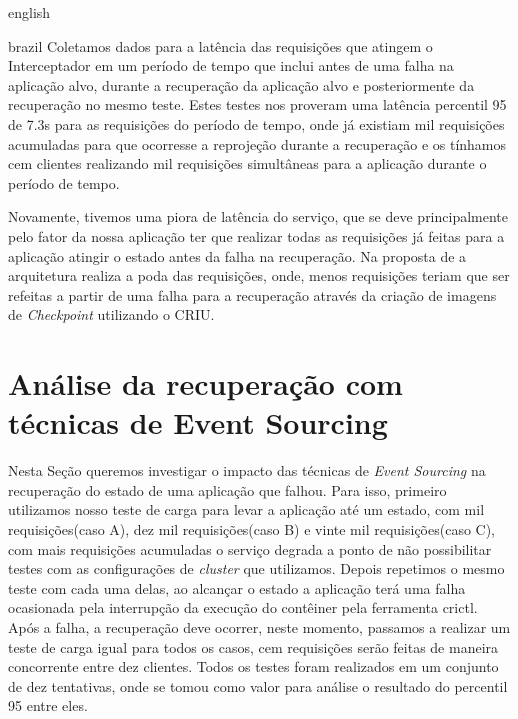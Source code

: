 \begin{otherlanguage*}{english}
\begin{otherlanguage*}{brazil}
Coletamos dados para a latência das requisições que atingem o Interceptador em um período de
tempo que inclui antes de uma falha na aplicação alvo, durante a recuperação da aplicação
alvo e posteriormente da recuperação no mesmo teste. Estes testes nos proveram uma latência
percentil 95 de 7.3s para as requisições do período de tempo, onde já existiam mil requisições
acumuladas para que ocorresse a reprojeção durante a recuperação e os tínhamos cem clientes
realizando mil requisições simultâneas para a aplicação durante o período de tempo.

Novamente, tivemos uma piora de latência do serviço, que se deve principalmente pelo fator
da nossa aplicação ter que realizar todas as requisições já feitas para a aplicação atingir
o estado antes da falha na recuperação. Na proposta de \cite{muller2022architecture} a
arquitetura realiza a poda das requisições, onde, menos requisições teriam que ser refeitas
a partir de uma falha para a recuperação através da criação de imagens de \textit{Checkpoint}
utilizando o CRIU.

\section{Análise da recuperação com técnicas de Event Sourcing}

Nesta Seção queremos investigar o impacto das técnicas de \textit{Event Sourcing} na
recuperação do estado de uma aplicação que falhou. Para isso, primeiro utilizamos nosso teste
de carga para levar a aplicação até um estado, com mil requisições(caso A), dez mil
requisições(caso B) e vinte mil requisições(caso C), com mais requisições acumuladas o serviço
degrada a ponto de não possibilitar testes com as configurações de \textit{cluster} que utilizamos.
Depois repetimos o mesmo teste com cada uma delas, ao alcançar o estado a aplicação terá uma falha
ocasionada pela interrupção da execução do contêiner pela ferramenta crictl. Após a falha,
a recuperação deve ocorrer, neste momento, passamos a realizar um teste de carga igual para
todos os casos, cem requisições serão feitas de maneira concorrente entre dez clientes. Todos
os testes foram realizados em um conjunto de dez tentativas, onde se tomou como valor para análise
o resultado do percentil 95 entre eles.


\end{otherlanguage*}
\end{otherlanguage*}
